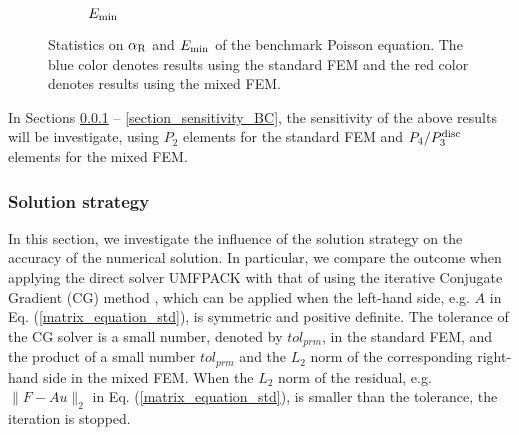 \documentclass[review,3p]{elsarticle}
\begin{document}
\begin{figure}[!ht]
\begin{subfigure}[b]{0.35\textwidth}
{
}
\vspace{-0.2cm}
\caption{$E_{\rm min}$}
\label{E_min_benchmark_Poisson}
\end{subfigure}
\caption{Statistics on $\alpha_{\rm R}$ and $E_{\rm min}$ of the benchmark Poisson equation. The blue color denotes results using the standard FEM and the red color denotes results using the mixed FEM.}
\label{alpha_R_E_min_benchmark_Poisson}
\end{figure}

In Sections \ref{section_sensitivity_solver} -- \ref{section_sensitivity_BC}, the sensitivity of the above results will be investigate, using $P_2$ elements for the standard FEM and $P_4/P_3^{\rm disc}$ elements for the mixed FEM.

\subsubsection{Solution strategy}		\label{section_sensitivity_solver}

In this section, we investigate the influence of the solution strategy on the accuracy of the numerical solution. In particular, we compare the outcome when applying the direct solver UMFPACK with that of using the iterative Conjugate Gradient (CG) method \cite{ginsburg1963cg}, which can be applied when the left-hand side, e.g. $A$ in Eq. (\ref{matrix_equation_std}), is symmetric and positive definite. The tolerance of the CG solver is a small number, denoted by $tol_{prm}$, in the standard FEM, and the product of a small number $tol_{prm}$ and the $L_2$ norm of the corresponding right-hand side in the mixed FEM.
When the $L_2$ norm of the residual, e.g. $\|F-Au\|_2$ in Eq. (\ref{matrix_equation_std}), is smaller than the tolerance, the iteration is stopped.
\end{document}
